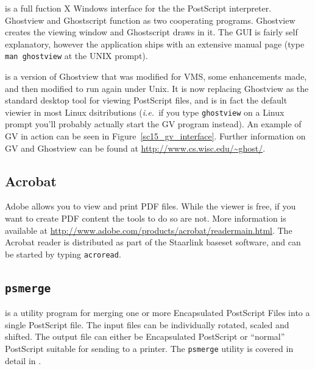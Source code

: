 \documentclass[twoside,11pt]{starlink}
\begin{document}
is a full fuction X Windows interface for the
 the PostScript interpreter. Ghostview
and Ghostscript function as two cooperating programs. Ghostview
creates the viewing window and Ghostscript draws in it. The GUI is
fairly self explanatory, however the application ships with an
extensive manual page (type \texttt{man ghostview} at the UNIX prompt).

 is
a version of Ghostview that was modified for VMS, some enhancements
made, and then modified to run again under Unix. It is now replacing
Ghostview as the standard desktop tool for viewing PostScript files,
and is in fact the default viewier in most Linux dsitributions (\emph{i.e.\ }if you type \texttt{ghostview} on a Linux prompt you'll probably
actually start the GV program instead). An example of GV in action can
be seen in Figure~\ref{sc15_gv_interface}. Further information on GV
and Ghostview can be found at \url{http://www.cs.wisc.edu/~ghost/}.


\subsection{Acrobat\label{sc15_acrobat}}

Adobe  allows
you to view and print PDF files. While the viewer is free, if you want
to create PDF content the tools to do so are not. More information is
available at \url{http://www.adobe.com/products/acrobat/readermain.html}.
The Acrobat reader is distributed as part of the Staarlink baseset
software, and can be started by typing \texttt{acroread}.

\subsection{\texttt{psmerge}\label{sc15_psmerge}}

 is a utility program for merging one or
more Encapsulated PostScript Files into a single PostScript file. The
input files can be individually rotated, scaled and shifted. The
output file can either be Encapsulated PostScript or ``normal''
PostScript suitable for sending to a printer. The \texttt{psmerge}
utility is covered in detail in .
\end{document}
